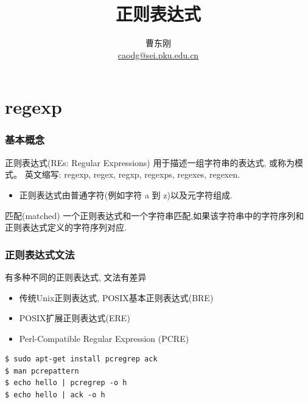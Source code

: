\documentclass[compress]{beamer}
\begin{document}
					
\title{正则表达式}

\author[\href{http://c.pku.edu.cn/}{http://c.pku.edu.cn/}]
{曹东刚\\\href{mailto:caodg@sei.pku.edu.cn}{caodg@sei.pku.edu.cn}}


\date{}


\begin{frame}
	\titlepage
\end{frame}

\section{regexp}

\begin{frame}
\frametitle{基本概念}

\begin{block}{正则表达式(REs: Regular Expressions)}
用于描述一组字符串的表达式, 或称为模式。 英文缩写:
regexp, regex, regxp, regexps, regexes, regexen.

\begin{itemize}
\item 正则表达式由普通字符(例如字符 a 到 z)以及元字符组成.
\end{itemize}
\end{block}

\begin{block}{匹配(matched)}
一个正则表达式和一个字符串匹配,如果该字符串中的字符序列和正则表达式定义的字符序列对应.
\end{block}
\end{frame}


\begin{frame}[fragile]
\frametitle{正则表达式文法}
有多种不同的正则表达式, 文法有差异
    \begin{itemize}
    \item 传统Unix正则表达式, POSIX基本正则表达式(BRE)
    \item POSIX扩展正则表达式(ERE)
    \item Perl-Compatible Regular Expression (PCRE)
    \end{itemize}
\begin{Verbatim}
$ sudo apt-get install pcregrep ack
$ man pcrepattern
$ echo hello | pcregrep -o h
$ echo hello | ack -o h
\end{Verbatim}
\end{frame}
\end{document}

